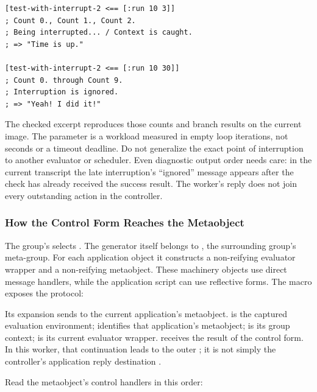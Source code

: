 \begin{codeblock}
\begin{lstlisting}
[test-with-interrupt-2 <== [:run 10 3]]
; Count 0., Count 1., Count 2.
; Being interrupted... / Context is caught.
; => "Time is up."

[test-with-interrupt-2 <== [:run 10 30]]
; Count 0. through Count 9.
; Interruption is ignored.
; => "Yeah! I did it!"
\end{lstlisting}
\end{codeblock}

The checked excerpt reproduces those counts and branch results on the
current image. The parameter  is a workload measured in empty
loop iterations, not seconds or a timeout deadline. Do not generalize
the exact point of interruption to another evaluator or scheduler.
Even diagnostic output order needs care: in the current transcript the
late interruption's ``ignored'' message appears after the check has
already received the success result. The worker's reply does not join
every outstanding action in the controller.

\subsubsection{How the Control Form Reaches the Metaobject}

The group's  selects .
The generator itself belongs to , the surrounding
group's meta-group. For each application object it constructs a
non-reifying evaluator wrapper and a non-reifying metaobject. These
machinery objects use direct message handlers, while the application
script can use reflective forms.
The macro exposes the protocol:


Its expansion sends
to the current application's metaobject.  is the captured
evaluation environment;  identifies that application's
metaobject;  is its group context;  is its current
evaluator wrapper.  receives the result of the control form.
In this worker, that continuation leads to the outer \code{!}; it is
not simply the controller's application reply destination .

Read the metaobject's control handlers in this order:


